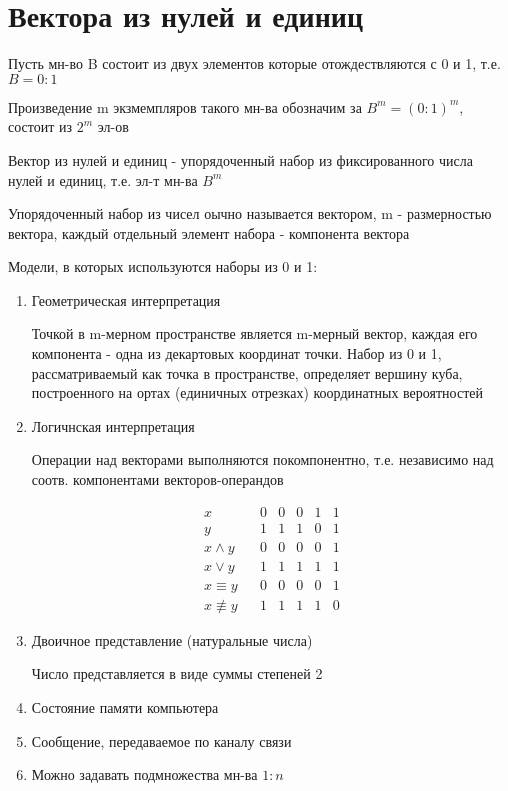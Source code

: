 \documentclass[discrete.tex]{subfiles}
\begin{document}
\section{Вектора из нулей и единиц}
Пусть мн-во B состоит из двух элементов которые отождествляются с 0 и 1, т.е. $B = 0:1$

Произведение m экзмемпляров такого мн-ва обозначим за $B^m=(0:1)^m$, состоит из $2^m$ эл-ов
\begin{definition}
  Вектор из нулей и единиц - упорядоченный набор из фиксированного числа нулей и единиц, т.е. эл-т мн-ва $B^m$
\end{definition}
Упорядоченный набор из чисел оычно называется вектором, m - размерностью вектора, каждый отдельный элемент набора - компонента вектора
\begin{remark}
  Модели, в которых используются наборы из 0 и 1:
  \begin{enumerate}
    \item Геометрическая интерпретация

    Точкой в m-мерном пространстве является m-мерный вектор, каждая его компонента - одна из декартовых координат точки. Набор из 0 и 1, рассматриваемый как точка в пространстве, определяет вершину куба, построенного на ортах (единичных отрезках) координатных вероятностей
    \item Логичнская интерпретация

    Операции над векторами выполняются покомпонентно, т.е. независимо над соотв. компонентами векторов-операндов
    \begin{Example}
      \[\begin{matrix}
        x && 0 & 0 & 0 & 1 & 1\\
        y && 1 & 1 & 1 & 0 & 1\\
        x \wedge y && 0 & 0 & 0 & 0 & 1\\
        x \vee y && 1 & 1 & 1 & 1 & 1\\
        x \equiv y && 0 & 0 & 0 & 0 & 1\\
        x \not \equiv y && 1 & 1 & 1 & 1 & 0
      \end{matrix}\]
    \end{Example}
    \item Двоичное представление (натуральные числа)

    Число представляется в виде суммы степеней 2
    \item Состояние памяти компьютера
    \item Сообщение, передаваемое по каналу связи
    \item Можно задавать подмножества мн-ва $1:n$
  \end{enumerate}
\end{remark}
\end{document}
